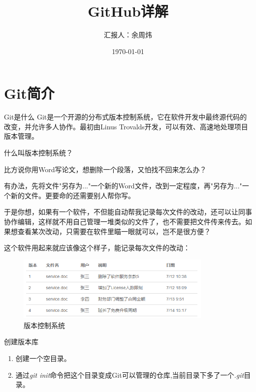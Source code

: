 \documentclass[hyperref,UTF8,10pt]{beamer}
\title{GitHub详解}
\author[Peter YU]
{
汇报人：余周炜
}
\institute[Tongji CSGI]{同济大学\quad 测绘与地理信息学院}
\date{\today} %
\numberwithin{equation}{section} %
\begin{document}
\newcommand{\redstress}[1]{{\color{red}{#1}}}

\begin{frame}
\maketitle
\end{frame}

\section{Git简介}

\begin{frame}{Git是什么}
    Git是一个开源的分布式版本控制系统，它在软件开发中最终源代码的改变，并允许多人协作。最初由Linus Trovalds开发，可以有效、高速地处理项目版本管理。

\end{frame}

\begin{frame}{什么叫版本控制系统？}

比方说你用Word写论文，想删除一个段落，又怕找不回来怎么办？

有办法，先将文件"另存为..."一个新的Word文件，改到一定程度，再"另存为..."一个新的文件。更要命的还需要别人帮你写。

于是你想，如果有一个软件，不但能自动帮我记录每次文件的改动，还可以让同事协作编辑，这样就不用自己管理一堆类似的文件了，也不需要把文件传来传去。如果想查看某次改动，只需要在软件里瞄一眼就可以，岂不是很方便？


这个软件用起来就应该像这个样子，能记录每次文件的改动：
\begin{figure}
\centering
\includegraphics[width=0.85\textwidth]{VerControl.PNG}
\caption{版本控制系统}
\end{figure}

\end{frame}


\begin{frame}{创建版本库}
\begin{enumerate}
\item 创建一个空目录。
\item 通过\emph{git init}命令把这个目录变成Git可以管理的仓库,当前目录下多了一个\emph{.git}目录。
\end{enumerate}
\end{frame}
\end{document}
